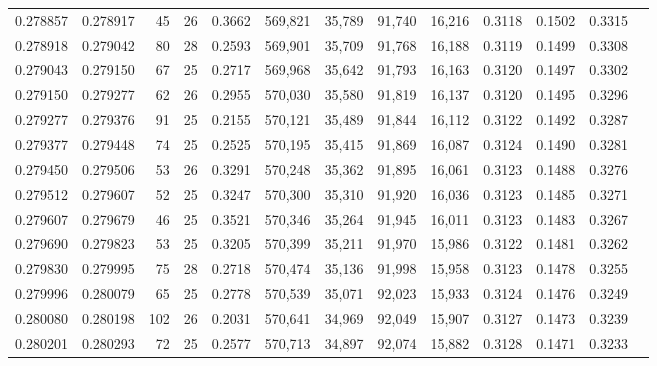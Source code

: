 \begin{tabular}{rrrrrrrrrrrrr}
0.278857 & 0.278917 &  45 &  26 &                                     0.3662 & 569,821 &  35,789 &  91,740 &  16,216 & 0.3118 & 0.1502 & 0.3315 \\
0.278918 & 0.279042 &  80 &  28 &                                     0.2593 & 569,901 &  35,709 &  91,768 &  16,188 & 0.3119 & 0.1499 & 0.3308 \\
0.279043 & 0.279150 &  67 &  25 &                                     0.2717 & 569,968 &  35,642 &  91,793 &  16,163 & 0.3120 & 0.1497 & 0.3302 \\
0.279150 & 0.279277 &  62 &  26 &                                     0.2955 & 570,030 &  35,580 &  91,819 &  16,137 & 0.3120 & 0.1495 & 0.3296 \\
0.279277 & 0.279376 &  91 &  25 &                                     0.2155 & 570,121 &  35,489 &  91,844 &  16,112 & 0.3122 & 0.1492 & 0.3287 \\
0.279377 & 0.279448 &  74 &  25 &                                     0.2525 & 570,195 &  35,415 &  91,869 &  16,087 & 0.3124 & 0.1490 & 0.3281 \\
0.279450 & 0.279506 &  53 &  26 &                                     0.3291 & 570,248 &  35,362 &  91,895 &  16,061 & 0.3123 & 0.1488 & 0.3276 \\
0.279512 & 0.279607 &  52 &  25 &                                     0.3247 & 570,300 &  35,310 &  91,920 &  16,036 & 0.3123 & 0.1485 & 0.3271 \\
0.279607 & 0.279679 &  46 &  25 &                                     0.3521 & 570,346 &  35,264 &  91,945 &  16,011 & 0.3123 & 0.1483 & 0.3267 \\
0.279690 & 0.279823 &  53 &  25 &                                     0.3205 & 570,399 &  35,211 &  91,970 &  15,986 & 0.3122 & 0.1481 & 0.3262 \\
0.279830 & 0.279995 &  75 &  28 &                                     0.2718 & 570,474 &  35,136 &  91,998 &  15,958 & 0.3123 & 0.1478 & 0.3255 \\
0.279996 & 0.280079 &  65 &  25 &                                     0.2778 & 570,539 &  35,071 &  92,023 &  15,933 & 0.3124 & 0.1476 & 0.3249 \\
0.280080 & 0.280198 & 102 &  26 &                                     0.2031 & 570,641 &  34,969 &  92,049 &  15,907 & 0.3127 & 0.1473 & 0.3239 \\
0.280201 & 0.280293 &  72 &  25 &                                     0.2577 & 570,713 &  34,897 &  92,074 &  15,882 & 0.3128 & 0.1471 & 0.3233 \\

\end{tabular}
